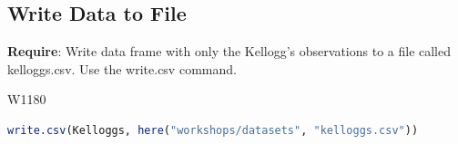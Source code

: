 \subsection{Write Data to File}

\noindent\textbf{Require}: Write data frame with only the Kellogg’s observations to a file called kelloggs.csv. Use the write.csv command.


\begin{ocg}{}{W118}{0}
\begin{lstlisting}[language = R]
write.csv(Kelloggs, here("workshops/datasets", "kelloggs.csv"))
\end{lstlisting}
\end{ocg}